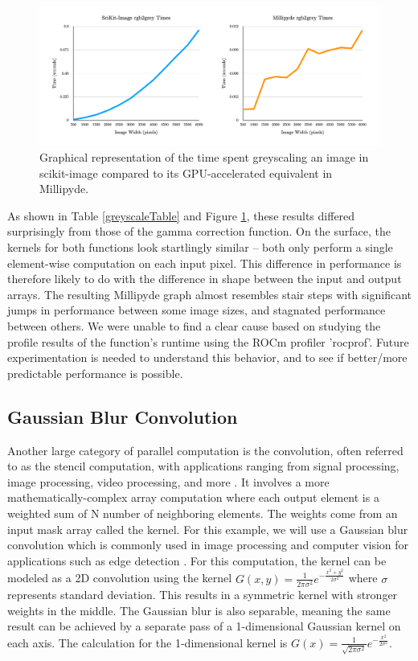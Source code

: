 \begin{figure}[H]
\includegraphics[width=\textwidth]{figures/greyscaleComparison.png}
\centering
\caption{Graphical representation of the time spent greyscaling an image in scikit-image compared to its GPU-accelerated equivalent in Millipyde.}
\label{greyscaleComparison}
\end{figure}

\quad As shown in Table \ref{greyscaleTable} and Figure \ref{greyscaleComparison}, these results differed surprisingly from those of the gamma correction function. On the surface, the kernels for both functions look startlingly similar -- both only perform a single element-wise computation on each input pixel. This difference in performance is therefore likely to do with the difference in shape between the input and output arrays. The resulting Millipyde graph almost resembles stair steps with significant jumps in performance between some image sizes, and stagnated performance between others. We were unable to find a clear cause based on studying the profile results of the function's runtime using the ROCm profiler 'rocprof'. Future experimentation is needed to understand this behavior, and to see if better/more predictable performance is possible. 

\subsection{Gaussian Blur Convolution}

Another large category of parallel computation is the convolution, often referred to as the stencil computation, with applications ranging from signal processing, image processing, video processing, and more \cite{greenBook}. It involves a more mathematically-complex array computation where each output element is a weighted sum of N number of neighboring elements. The weights come from an input mask array called the kernel. For this example, we will use a Gaussian blur convolution which is commonly used in image processing and computer vision for applications such as edge detection \cite{gaussEdge}. For this computation, the kernel can be modeled as a 2D convolution using the kernel $G(x, y) = \frac{1}{2 \pi \sigma^2} e^{-\frac{x^2 + y^2}{2 \sigma^2}}$ where $\sigma$ represents standard deviation. This results in a symmetric kernel with stronger weights in the middle. The Gaussian blur is also separable, meaning the same result can be achieved by a separate pass of a 1-dimensional Gaussian kernel on each axis. The calculation for the 1-dimensional kernel is $G(x) = \frac{1}{\sqrt{2 \pi \sigma^2}} e^{-\frac{x^2}{2 \sigma^2}}$.

